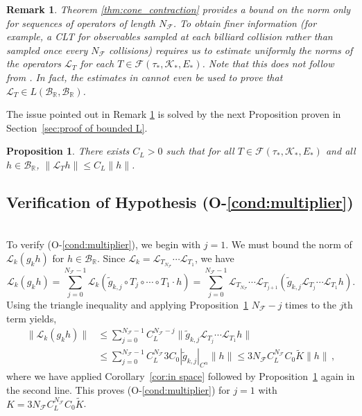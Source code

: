 \documentclass{amsart}
\numberwithin{equation}{section}
\newtheorem{prop}[thm]{Proposition}
\newtheorem{rem}[thm]{Remark}
\newcommand\cB{{\mathcal B}}
\newcommand\cF{{\mathcal F}}
\newcommand\cK{{\mathcal K}}
\newcommand\cL{{\mathcal L}}
\newcommand\bR{{\mathbb R}}
\begin{document}
\begin{rem}\label{rem:one_step}
Theorem \ref{thm:cone_contraction} provides a bound on the norm only for sequences of operators of length $N_{\cF}$. To obtain finer information (for example, a CLT for observables sampled at each
billiard collision rather than sampled once every $N_{\cF}$ collisions) requires us  to estimate uniformly the norms of the operators $\cL_T$ for each $T \in \cF(\tau_*, \cK_*, E_*)$. Note that this does not follow from \cite{DL22}. In fact, the estimates in  \cite{DL22} cannot even be used to prove that $\cL_T\in L(\cB_\bR, \cB_\bR)$.
\end{rem}
The issue pointed out in Remark \ref{rem:one_step} is solved by the next Proposition proven in Section~\ref{sec:proof of bounded L}.
\begin{prop}
\label{lem:bounded L}
There exists $C_L >0$ such that for all $T \in \cF(\tau_*, \cK_*, E_*)$ and all $h \in \cB_{\bR}$,
$\| \cL_T h \| \le C_L \| h \|$.
\end{prop}


\subsection{Verification of Hypothesis (O-\ref{cond:multiplier})}\ \\ \label{sec:check O1}
To verify (O-\ref{cond:multiplier}), we begin with $j=1$.  
We must bound the norm of $\cL_k (g_k h)$ for $h \in \cB_{\bR}$.
Since $\cL_k = \cL_{T_{N_\cF}} \cdots \cL_{T_1}$, we have
\[
\cL_k(g_k h)  = \sum_{j=0}^{N_\cF-1} \cL_k( \tilde g_{k,j} \circ T_j \circ \cdots \circ T_1 \cdot h)  = \sum_{j=0}^{N_\cF -1} \cL_{T_{N_\cF}} \cdots \cL_{T_{j+1}} ( \tilde g_{k,j} \cL_{T_j} \cdots \cL_{T_1} h) .
\]
Using the triangle inequality and applying Proposition~\ref{lem:bounded L} $N_{\cF} - j$ times to the $j$th term yields,
\begin{equation}
\label{eq:L_k norm}
\begin{split}
\| \cL_k(g_k h) \| & \le \sum_{j=0}^{N_\cF-1} C_L^{N_\cF-j} \| \tilde g_{k,j} \cL_{T_j} \cdots \cL_{T_1} h \| \\
& \le \sum_{j=0}^{N_\cF-1} C_L^{N_\cF} 3 C_0 | \tilde g_{k,j}|_{C^\alpha} \| h \| 
\le 3 N_{\cF} C_L^{N_\cF} C_0 \tilde K \| h \| \, ,
 \end{split}
\end{equation}
where we have applied Corollary~\ref{cor:in space} followed by Proposition~\ref{lem:bounded L} again in the second line.
This proves (O-\ref{cond:multiplier}) for $j=1$ with $K = 3 N_{\cF} C_L^{N_\cF} C_0 \tilde K$.
\end{document}
